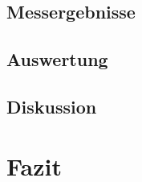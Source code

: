 \documentclass[12pt,a4paper]{article}
\begin{document}
\subsection*{Messergebnisse}
\subsection*{Auswertung}
\subsection*{Diskussion}





\section{Fazit}
\end{document}
